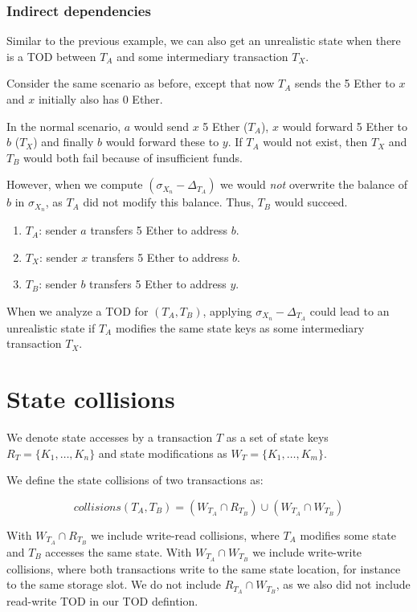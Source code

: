 \documentclass[draft,final]{vutinfth} %
\begin{document}
\subsubsection{Indirect dependencies}

Similar to the previous example, we can also get an unrealistic state when there is a TOD between $T_A$ and some intermediary transaction $T_X$.

Consider the same scenario as before, except that now $T_A$ sends the 5 Ether to $x$ and $x$ initially also has 0 Ether.

In the normal scenario, $a$ would send $x$ 5 Ether ($T_A$), $x$ would forward 5 Ether to $b$ ($T_X$) and finally $b$ would forward these to $y$. If $T_A$ would not exist, then $T_X$ and $T_B$ would both fail because of insufficient funds.

However, when we compute $(\sigma_{X_n} - \Delta_{T_A})$ we would \emph{not} overwrite the balance of $b$ in $\sigma_{X_n}$, as $T_A$ did not modify this balance. Thus, $T_B$ would succeed.

\begin{enumerate}
    \item $T_A$: sender $a$ transfers 5 Ether to address $b$.
    \item $T_X$: sender $x$ transfers 5 Ether to address $b$.
    \item $T_B$: sender $b$ transfers 5 Ether to address $y$.
\end{enumerate}

When we analyze a TOD for $(T_A, T_B)$, applying $\sigma_{X_n} - \Delta_{T_A}$ could lead to an unrealistic state if $T_A$ modifies the same state keys as some intermediary transaction $T_X$.

\section{State collisions}

We denote state accesses by a transaction $T$ as a set of state keys $R_T = \{ K_1, \dots, K_n \}$ and state modifications as $W_T = \{ K_1, \dots, K_m \}$.

We define the state collisions of two transactions as:

$$collisions(T_A, T_B) = (W_{T_A} \cap R_{T_B}) \cup (W_{T_A} \cap W_{T_B})$$

With $W_{T_A} \cap R_{T_B}$ we include write-read collisions, where $T_A$ modifies some state and $T_B$ accesses the same state. With $W_{T_A} \cap W_{T_B}$ we include write-write collisions, where both transactions write to the same state location, for instance to the same storage slot. We do not include $R_{T_A} \cap W_{T_B}$, as we also did not include read-write TOD in our TOD defintion.
\end{document}
